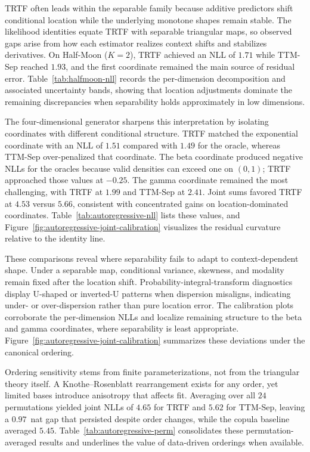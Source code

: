 \documentclass[11pt,a4paper,twoside]{book}\usepackage[]{graphicx}\usepackage[]{xcolor}
\begin{document}
TRTF often leads within the separable family because additive predictors shift conditional location while the underlying monotone shapes remain stable. The likelihood identities equate TRTF with separable triangular maps, so observed gaps arise from how each estimator realizes context shifts and stabilizes derivatives. On Half-Moon ($K=2$), TRTF achieved an NLL of $1.71$ while TTM-Sep reached $1.93$, and the first coordinate remained the main source of residual error. Table~\ref{tab:halfmoon-nll} records the per-dimension decomposition and associated uncertainty bands, showing that location adjustments dominate the remaining discrepancies when separability holds approximately in low dimensions.

The four-dimensional generator sharpens this interpretation by isolating coordinates with different conditional structure. TRTF matched the exponential coordinate with an NLL of $1.51$ compared with $1.49$ for the oracle, whereas TTM-Sep over-penalized that coordinate. The beta coordinate produced negative NLLs for the oracles because valid densities can exceed one on $(0,1)$; TRTF approached those values at $-0.25$. The gamma coordinate remained the most challenging, with TRTF at $1.99$ and TTM-Sep at $2.41$. Joint sums favored TRTF at $4.53$ versus $5.66$, consistent with concentrated gains on location-dominated coordinates. Table~\ref{tab:autoregressive-nll} lists these values, and Figure~\ref{fig:autoregressive-joint-calibration} visualizes the residual curvature relative to the identity line.

These comparisons reveal where separability fails to adapt to context-dependent shape. Under a separable map, conditional variance, skewness, and modality remain fixed after the location shift. Probability-integral-transform diagnostics display U-shaped or inverted-U patterns when dispersion misaligns, indicating under- or over-dispersion rather than pure location error. The calibration plots corroborate the per-dimension NLLs and localize remaining structure to the beta and gamma coordinates, where separability is least appropriate. Figure~\ref{fig:autoregressive-joint-calibration} summarizes these deviations under the canonical ordering.

Ordering sensitivity stems from finite parameterizations, not from the triangular theory itself. A Knothe--Rosenblatt rearrangement exists for any order, yet limited bases introduce anisotropy that affects fit. Averaging over all $24$ permutations yielded joint NLLs of $4.65$ for TRTF and $5.62$ for TTM-Sep, leaving a $0.97$~nat gap that persisted despite order changes, while the copula baseline averaged $5.45$. Table~\ref{tab:autoregressive-perm} consolidates these permutation-averaged results and underlines the value of data-driven orderings when available.
\end{document}
